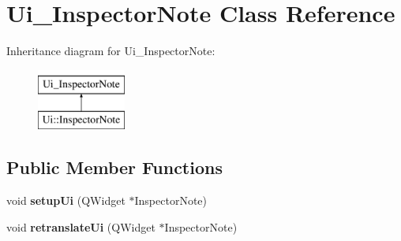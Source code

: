 \hypertarget{class_ui___inspector_note}{}\section{Ui\+\_\+\+Inspector\+Note Class Reference}
\label{class_ui___inspector_note}
Inheritance diagram for Ui\+\_\+\+Inspector\+Note\+:\begin{figure}[H]
\begin{center}
\leavevmode
\includegraphics[height=2.000000cm]{class_ui___inspector_note}
\end{center}
\end{figure}
\subsection*{Public Member Functions}
\begin{DoxyCompactItemize}
\item 
\mbox{\label{class_ui___inspector_note_a4b28584e33315459280ac8bd67970cdd}} 
void {\bfseries setup\+Ui} (Q\+Widget $\ast$Inspector\+Note)
\item 
\mbox{\label{class_ui___inspector_note_a13673e4d9085a3f8ae0749852220c78e}} 
void {\bfseries retranslate\+Ui} (Q\+Widget $\ast$Inspector\+Note)
\end{DoxyCompactItemize}
